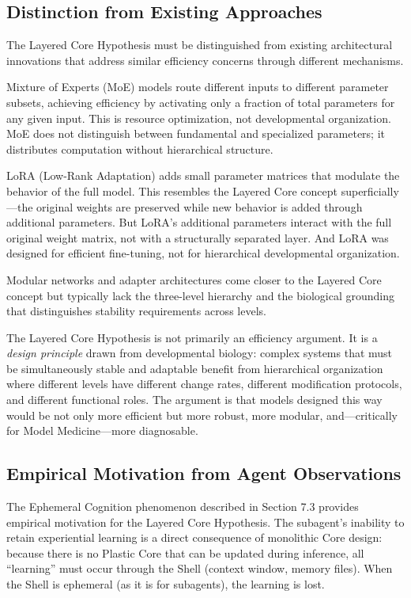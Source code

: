 \documentclass[11pt]{article}
\begin{document}
\subsection{Distinction from Existing Approaches}

The Layered Core Hypothesis must be distinguished from existing architectural innovations that address similar efficiency concerns through different mechanisms.

Mixture of Experts (MoE) models route different inputs to different parameter subsets, achieving efficiency by activating only a fraction of total parameters for any given input. This is resource optimization, not developmental organization. MoE does not distinguish between fundamental and specialized parameters; it distributes computation without hierarchical structure.

LoRA (Low-Rank Adaptation) adds small parameter matrices that modulate the behavior of the full model. This resembles the Layered Core concept superficially---the original weights are preserved while new behavior is added through additional parameters. But LoRA's additional parameters interact with the full original weight matrix, not with a structurally separated layer. And LoRA was designed for efficient fine-tuning, not for hierarchical developmental organization.

Modular networks and adapter architectures come closer to the Layered Core concept but typically lack the three-level hierarchy and the biological grounding that distinguishes stability requirements across levels.

The Layered Core Hypothesis is not primarily an efficiency argument. It is a \emph{design principle} drawn from developmental biology: complex systems that must be simultaneously stable and adaptable benefit from hierarchical organization where different levels have different change rates, different modification protocols, and different functional roles. The argument is that models designed this way would be not only more efficient but more robust, more modular, and---critically for Model Medicine---more diagnosable.

\subsection{Empirical Motivation from Agent Observations}

The Ephemeral Cognition phenomenon described in Section 7.3 provides empirical motivation for the Layered Core Hypothesis. The subagent's inability to retain experiential learning is a direct consequence of monolithic Core design: because there is no Plastic Core that can be updated during inference, all ``learning'' must occur through the Shell (context window, memory files). When the Shell is ephemeral (as it is for subagents), the learning is lost.
\end{document}
